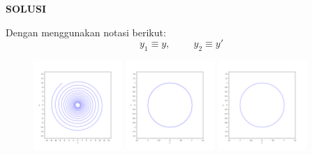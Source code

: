 \textbf{SOLUSI}

Dengan menggunakan notasi berikut:
\begin{equation}
y_1 \equiv y, \hspace{1cm} y_2 \equiv y'
\end{equation}



\begin{figure}[H]
\centering
\includegraphics[width=0.3\textwidth]{images/soal_01_ode_euler_y1_y2.pdf}
\includegraphics[width=0.3\textwidth]{images/soal_01_ode_euler_PC_y1_y2.pdf}
\includegraphics[width=0.3\textwidth]{images/soal_01_ode_RK4_y1_y2.pdf}
\par
\end{figure}

